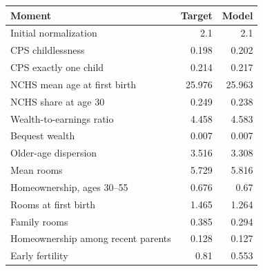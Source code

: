 \begin{tabular}{lrr}
\toprule
Moment & Target & Model \\
\midrule
Initial normalization & 2.1 & 2.1 \\
CPS childlessness & 0.198 & 0.202 \\
CPS exactly one child & 0.214 & 0.217 \\
NCHS mean age at first birth & 25.976 & 25.963 \\
NCHS share at age 30 & 0.249 & 0.238 \\
Wealth-to-earnings ratio & 4.458 & 4.583 \\
Bequest wealth & 0.007 & 0.007 \\
Older-age dispersion & 3.516 & 3.308 \\
Mean rooms & 5.729 & 5.816 \\
Homeownership, ages 30--55 & 0.676 & 0.67 \\
Rooms at first birth & 1.465 & 1.264 \\
Family rooms & 0.385 & 0.294 \\
Homeownership among recent parents & 0.128 & 0.127 \\
Early fertility & 0.81 & 0.553 \\
\bottomrule
\end{tabular}
